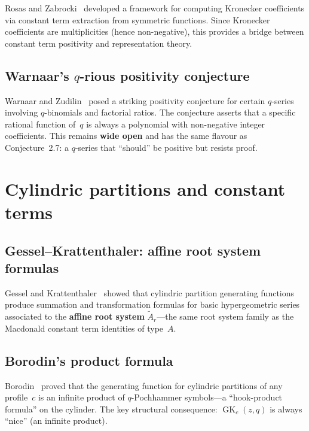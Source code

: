 \documentclass[11pt]{article}
\newcommand{\GK}{\operatorname{GK}}
\begin{document}
Rosas and Zabrocki~\cite{rosas-zabrocki} developed a framework
for computing Kronecker coefficients via constant term extraction
from symmetric functions. Since Kronecker coefficients are
multiplicities (hence non-negative), this provides a bridge
between constant term positivity and representation theory.

\subsection{Warnaar's $q$-rious positivity conjecture}

Warnaar and Zudilin~\cite{warnaar-zudilin-2011} posed a
striking positivity conjecture for certain $q$-series involving
$q$-binomials and factorial ratios. The conjecture asserts that
a specific rational function of~$q$ is always a polynomial with
non-negative integer coefficients. This remains \textbf{wide
open} and has the same flavour as Conjecture~2.7: a $q$-series
that ``should'' be positive but resists proof.

\section{Cylindric partitions and constant terms}
\label{sec:cpp}

\subsection{Gessel--Krattenthaler: affine root system formulas}

Gessel and Krattenthaler~\cite{gessel-krattenthaler-1997} showed
that cylindric partition generating functions produce summation
and transformation formulas for basic hypergeometric series
associated to the \textbf{affine root system}
$\widetilde{A}_r$---the same root system family as the
Macdonald constant term identities of type~$A$.

\subsection{Borodin's product formula}

Borodin~\cite{borodin-2007} proved that the generating function
for cylindric partitions of any profile~$c$ is an infinite
product of $q$-Pochhammer symbols---a ``hook-product formula''
on the cylinder. The key structural consequence:
$\GK_c(z,q)$ is always ``nice'' (an infinite product).
\end{document}
